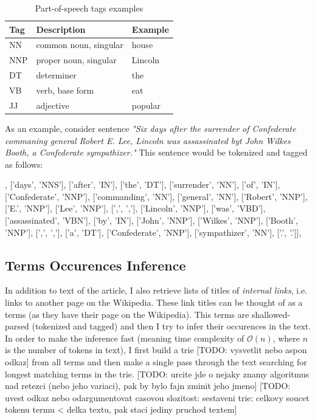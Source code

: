 \documentclass[a4paper, 12pt, twoside]{fithesis2}		%
\renewcommand{\_}{\leavevmode \kern0.07em\vbox{\hrule width0.4em}}
\begin{document}
\begin{table}[h]
\begin{center}
\begin{tabular}{| l | l | l |}
  \hline
  Tag & Description & Example \\
  \hline \hline
  NN & common noun, singular & house         \\ \hline
  NNP & proper noun, singular & Lincoln     \\ \hline
  DT & determiner & the \\ \hline
  VB & verb, base form & eat \\ \hline
  JJ & adjective & popular \\ \hline
\end{tabular}
\end{center}
\caption{Part-of-speech tags examples \cite{penn-tagset} }
\end{table}

As an example, consider sentence \textit{"Six days after the surrender of Confederate commaning general Robert E. Lee, Lincoln was assassinated byt John Wilkes Booth, a Confederate sympathizer."} This sentence would be tokenized and tagged as follows:
\begin{code}
[['Six', 'CD'], ['days', 'NNS'], ['after', 'IN'], ['the', 'DT'],
['surrender', 'NN'], ['of', 'IN'], ['Confederate', 'NNP'],
['commanding', 'NN'], ['general', 'NN'], ['Robert', 'NNP'],
['E.', 'NNP'], ['Lee', 'NNP'], [',', ','], ['Lincoln', 'NNP'],
['was', 'VBD'], ['assassinated', 'VBN'], ['by', 'IN'],
['John', 'NNP'], ['Wilkes', 'NNP'], ['Booth', 'NNP'],
[',', ','], ['a', 'DT'], ['Confederate', 'NNP'],
['sympathizer', 'NN'], ['.', '.']],
\end{code}

\subsection*{Terms Occurences Inference}
In addition to text of the article, I also retrieve lists of titles of \textit{internal links}, i.e. links to another page on the Wikipedia.
These link titles can be thought of as a terms (as they have their page on the Wikipedia).
This terms are shallowed-parsed (tokenized and tagged)
and then I try to infer their occurences in the text.
In order to make the inference fast (meaning time complexity of $\mathcal{O}(n)$, where $n$ is the number of tokens in text), I first build a trie [TODO: vysvetlit nebo aspon odkaz] from all terms and then make a single pass through the text searching for longest matching terms in the trie. [TODO: urcite jde o nejaky znamy algoritmus nad retezci (nebo jeho variaci), pak by bylo fajn zminit jeho jmeno]
[TODO: uvest odkaz nebo odargumentovat casovou slozitost: sestaveni trie: celkovy soucet tokenu termu < delka textu, pak staci jediny pruchod textem]
\end{document}
